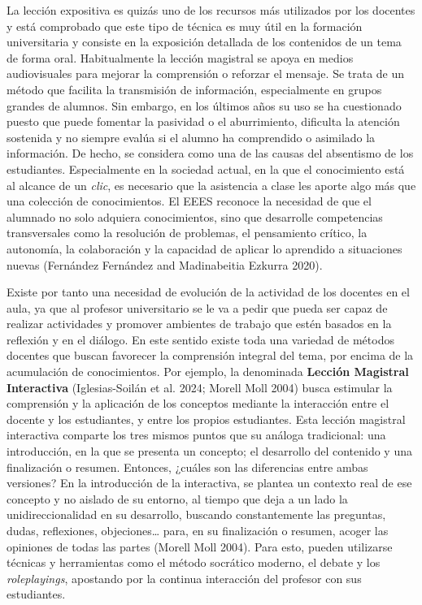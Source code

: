 \documentclass[
  11pt,
  a4paper,
  twoside]{scrreprt}
\begin{document}
La lección expositiva es quizás uno de los recursos más utilizados por
los docentes y está comprobado que este tipo de técnica es muy útil en
la formación universitaria y consiste en la exposición detallada de los
contenidos de un tema de forma oral. Habitualmente la lección magistral
se apoya en medios audiovisuales para mejorar la comprensión o reforzar
el mensaje. Se trata de un método que facilita la transmisión de
información, especialmente en grupos grandes de alumnos. Sin embargo, en
los últimos años su uso se ha cuestionado puesto que puede fomentar la
pasividad o el aburrimiento, dificulta la atención sostenida y no
siempre evalúa si el alumno ha comprendido o asimilado la información.
De hecho, se considera como una de las causas del absentismo de los
estudiantes. Especialmente en la sociedad actual, en la que el
conocimiento está al alcance de un \emph{clic}, es necesario que la
asistencia a clase les aporte algo más que una colección de
conocimientos. El EEES reconoce la necesidad de que el alumnado no solo
adquiera conocimientos, sino que desarrolle competencias transversales
como la resolución de problemas, el pensamiento crítico, la autonomía,
la colaboración y la capacidad de aplicar lo aprendido a situaciones
nuevas (Fernández Fernández and Madinabeitia Ezkurra 2020).

Existe por tanto una necesidad de evolución de la actividad de los
docentes en el aula, ya que al profesor universitario se le va a pedir
que pueda ser capaz de realizar actividades y promover ambientes de
trabajo que estén basados en la reflexión y en el diálogo. En este
sentido existe toda una variedad de métodos docentes que buscan
favorecer la comprensión integral del tema, por encima de la acumulación
de conocimientos. Por ejemplo, la denominada \textbf{Lección Magistral
Interactiva} (Iglesias-Soilán et al. 2024; Morell Moll 2004) busca
estimular la comprensión y la aplicación de los conceptos mediante la
interacción entre el docente y los estudiantes, y entre los propios
estudiantes. Esta lección magistral interactiva comparte los tres mismos
puntos que su análoga tradicional: una introducción, en la que se
presenta un concepto; el desarrollo del contenido y una finalización o
resumen. Entonces, ¿cuáles son las diferencias entre ambas versiones? En
la introducción de la interactiva, se plantea un contexto real de ese
concepto y no aislado de su entorno, al tiempo que deja a un lado la
unidireccionalidad en su desarrollo, buscando constantemente las
preguntas, dudas, reflexiones, objeciones\ldots{} para, en su
finalización o resumen, acoger las opiniones de todas las partes (Morell
Moll 2004). Para esto, pueden utilizarse técnicas y herramientas como el
método socrático moderno, el debate y los \emph{roleplayings}, apostando
por la continua interacción del profesor con sus estudiantes.
\end{document}
